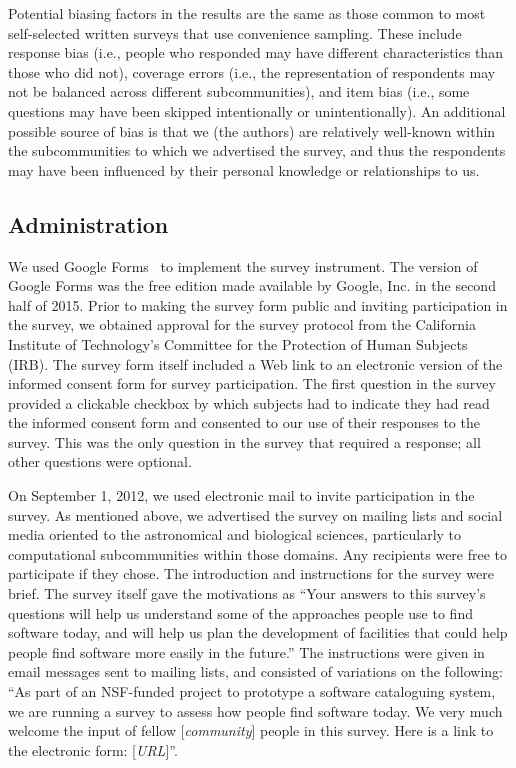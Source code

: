 \documentclass{casicswhitepaper}
\begin{document}
Potential biasing factors in the results are the same as those common to most self-selected written surveys that use convenience sampling.  These include response bias (i.e., people who responded may have different characteristics than those who did not), coverage errors (i.e., the representation of respondents may not be balanced across different subcommunities), and item bias (i.e., some questions may have been skipped intentionally or unintentionally).  An additional possible source of bias is that we (the authors) are relatively well-known within the subcommunities to which we advertised the survey, and thus the respondents may have been influenced by their personal knowledge or relationships to us.  


\subsection{Administration}

We used Google Forms~\cite{googleforms} to implement the survey instrument.  The version of Google Forms was the free edition made available by Google, Inc. in the second half of 2015.  Prior to making the survey form public and inviting participation in the survey, we obtained approval for the survey protocol from the California Institute of Technology's Committee for the Protection of Human Subjects (IRB).  The survey form itself included a Web link to an electronic version of the informed consent form for survey participation.  The first question in the survey provided a clickable checkbox by which subjects had to indicate they had read the informed consent form and consented to our use of their responses to the survey.  This was the only question in the survey that required a response; all other questions were optional.

On September 1, 2012, we used electronic mail to invite participation in the survey.  As mentioned above, we advertised the survey on mailing lists and social media oriented to the astronomical and biological sciences, particularly to computational subcommunities within those domains.  Any recipients were free to participate if they chose.  The introduction and instructions for the survey were brief.  The survey itself gave the motivations as ``Your answers to this survey's questions will help us understand some of the approaches people use to find software today, and will help us plan the development of facilities that could help people find software more easily in the future.''  The instructions were given in email messages sent to mailing lists, and consisted of variations on the following: ``As part of an NSF-funded project to prototype a software cataloguing system, we are running a survey to assess how people find software today.  We very much welcome the input of fellow [\emph{community}] people in this survey.  Here is a link to the electronic form: [\emph{URL}]''.
\end{document}
